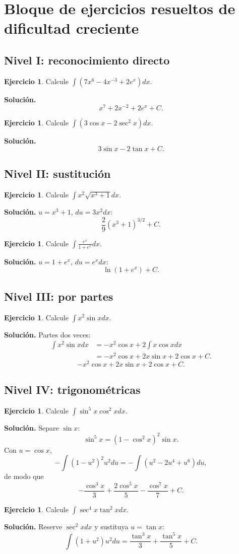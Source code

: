 \documentclass[12pt]{article}
\theoremstyle{definition}
\newtheorem{ejercicio}[teorema]{Ejercicio}
\theoremstyle{remark}
\begin{document}
\section{Bloque de ejercicios resueltos de dificultad creciente}
\subsection*{Nivel I: reconocimiento directo}
\begin{ejercicio}Calcule $\int(7x^6-4x^{-3}+2e^x)dx$.\end{ejercicio}
\textbf{Solución.}
\[\boxed{x^7+2x^{-2}+2e^x+C}.\]
\begin{ejercicio}Calcule $\int(3\cos x-2\sec^2x)dx$.\end{ejercicio}
\textbf{Solución.}
\[\boxed{3\sin x-2\tan x+C}.\]

\subsection*{Nivel II: sustitución}
\begin{ejercicio}Calcule $\int x^2\sqrt{x^3+1}dx$.\end{ejercicio}
\textbf{Solución.} $u=x^3+1$, $du=3x^2dx$:
\[\boxed{\frac{2}{9}(x^3+1)^{3/2}+C}.\]
\begin{ejercicio}Calcule $\int\frac{e^x}{1+e^x}dx$.\end{ejercicio}
\textbf{Solución.} $u=1+e^x$, $du=e^xdx$:
\[\boxed{\ln(1+e^x)+C}.\]

\subsection*{Nivel III: por partes}
\begin{ejercicio}Calcule $\int x^2\sin xdx$.\end{ejercicio}
\textbf{Solución.} Partes dos veces:
\begin{align*}
\int x^2\sin xdx&=-x^2\cos x+2\int x\cos xdx\\
&=-x^2\cos x+2x\sin x+2\cos x+C.
\end{align*}
\[\boxed{-x^2\cos x+2x\sin x+2\cos x+C}.\]

\subsection*{Nivel IV: trigonométricas}
\begin{ejercicio}Calcule $\int\sin^5x\cos^2xdx$.\end{ejercicio}
\textbf{Solución.} Separe $\sin x$:
\[\sin^5x=(1-\cos^2x)^2\sin x.\]
Con $u=\cos x$,
\[-\int(1-u^2)^2u^2du=-\int(u^2-2u^4+u^6)du,\]
de modo que
\[\boxed{-\frac{\cos^3x}{3}+\frac{2\cos^5x}{5}-\frac{\cos^7x}{7}+C}.\]
\begin{ejercicio}Calcule $\int\sec^4x\tan^2xdx$.\end{ejercicio}
\textbf{Solución.} Reserve $\sec^2x dx$ y sustituya $u=\tan x$:
\[\int(1+u^2)u^2du=\boxed{\frac{\tan^3x}{3}+\frac{\tan^5x}{5}+C}.\]
\end{document}
